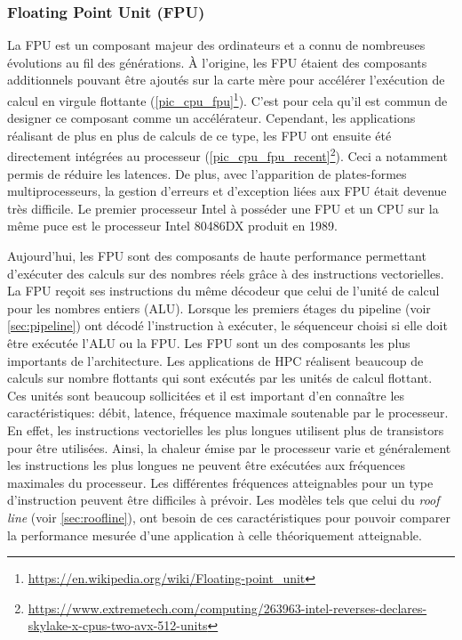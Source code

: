     \subsubsection{Floating Point Unit (FPU)}
        La FPU est un composant majeur des ordinateurs et a connu de nombreuses évolutions au fil des générations. À l'origine, les FPU étaient des composants additionnels pouvant être ajoutés sur la carte mère pour accélérer l'exécution de calcul en virgule flottante (\autoref{pic_cpu_fpu}\footnote{\url{https://en.wikipedia.org/wiki/Floating-point_unit}}). C'est pour cela qu'il est commun de designer ce composant comme un accélérateur. Cependant, les applications réalisant de plus en plus de calculs de ce type, les FPU ont ensuite été directement intégrées au processeur (\autoref{pic_cpu_fpu_recent}\footnote{\url{https://www.extremetech.com/computing/263963-intel-reverses-declares-skylake-x-cpus-two-avx-512-units}}). Ceci a notamment permis de réduire les latences. De plus, avec l'apparition de plates-formes multiprocesseurs, la gestion d'erreurs et d'exception liées aux FPU était devenue très difficile. Le premier processeur Intel à posséder une FPU et un CPU sur la même puce est le processeur Intel 80486DX produit en 1989.

        Aujourd'hui, les FPU sont des composants de haute performance permettant d'exécuter des calculs sur des nombres réels grâce à des instructions vectorielles. La FPU reçoit ses instructions du même décodeur que celui de l'unité de calcul pour les nombres entiers (ALU). Lorsque les premiers étages du pipeline (voir \autoref{sec:pipeline}) ont décodé l'instruction à exécuter, le séquenceur choisi si elle doit être exécutée l'ALU ou la FPU. 
        Les FPU sont un des composants les plus importants de l'architecture. Les applications de HPC réalisent beaucoup de calculs sur nombre flottants qui sont exécutés par les unités de calcul flottant. Ces unités sont beaucoup sollicitées et il est important d'en connaître les caractéristiques: débit, latence, fréquence maximale soutenable par le processeur. En effet, les instructions vectorielles les plus longues utilisent plus de transistors pour être utilisées. Ainsi, la chaleur émise par le processeur varie et généralement les instructions les plus longues ne peuvent être exécutées aux fréquences maximales du processeur. Les différentes fréquences atteignables pour un type d'instruction peuvent être difficiles à prévoir.
        Les modèles tels que celui du \textit{roof line} (voir \autoref{sec:roofline}), ont besoin de ces caractéristiques pour pouvoir comparer la performance mesurée d'une application à celle théoriquement atteignable. 
        

